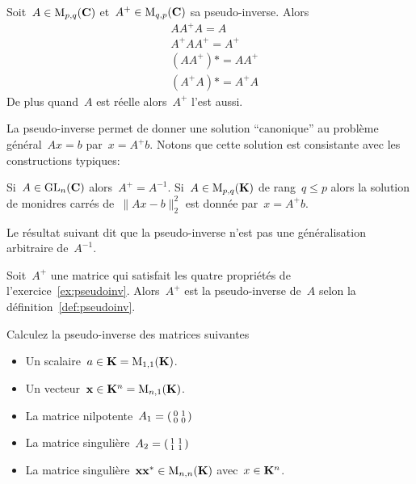 \begin{exercice}
	\label{ex:pseudoinv}
	Soit~$A\in\mathrm{M}_{p,q}(\mathbf{C})$ et~$A^+\in\mathrm{M}_{q,p}(\mathbf{C})$ sa pseudo-inverse.  Alors
	\begin{align*}
		& AA^+A=A \\
		& A^+AA^+=A^+ \\
		& (AA^+)*=AA^+ \\
		& (A^+A)*=A^+A
	\end{align*}
	De plus quand~$A$ est réelle alors~$A^+$ l'est aussi.
\end{exercice}

La pseudo-inverse permet de donner une solution ``canonique'' au problème
général~$Ax=b$ par~$x=A^+b$.  Notons que cette solution est consistante avec
les constructions typiques:

\begin{exercice}
	Si~$A\in\mathrm{GL}_n(\mathbf{C})$ alors~$A^+=A^{-1}$.
	Si~$A\in\mathrm{M}_{p,q}(\mathbf{K})$ de rang~$q\le p$ alors la solution de monidres carrés
	de~$\|Ax-b\|^2_2$ est donnée par~$x=A^+b$.
\end{exercice}

Le résultat suivant dit que la pseudo-inverse n'est pas une généralisation
arbitraire de~$A^{-1}$.

\begin{theorem}[Penrose 1955]
	Soit~$A^+$ une matrice qui satisfait les quatre propriétés de
	l'exercice~\ref{ex:pseudoinv}.  Alors~$A^+$ est la pseudo-inverse de~$A$
	selon la définition~\ref{def:pseudoinv}.
\end{theorem}

\begin{exercice}
	Calculez la pseudo-inverse des matrices suivantes
	\begin{itemize}
		\item Un scalaire~$a\in\mathbf{K}=\mathrm{M}_{1,1}(\mathbf{K})$.
		\item Un vecteur~$\mathbf{x}\in\mathbf{K}^n=\mathrm{M}_{n,1}(\mathbf{K})$.
		\item La matrice
			nilpotente~$A_1=\left(\begin{smallmatrix}0&1\\0&0\end{smallmatrix}\right)$
		\item La matrice
			singulière~$A_2=\left(\begin{smallmatrix}1&1\\1&1\end{smallmatrix}\right)$
		\item La matrice singulière~$\mathbf{x}\mathbf{x}^*\in\mathrm{M}_{n,n}(\mathbf{K})$ avec~$x\in\mathbf{K}^n$.
	\end{itemize}
\end{exercice}


